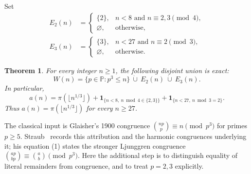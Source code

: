 \documentclass[11pt]{article}
\newtheorem{theorem}{Theorem}
\newcommand{\pr}{\mathbb P}
\newcommand{\ind}{\mathbf 1}
\begin{document}
Set
\begin{align*}
 E_2(n)&=\begin{cases}\{2\},&n<8\text{ and }n\equiv2,3\pmod4,\\
                         \varnothing,&\text{otherwise},\end{cases}\\
 E_3(n)&=\begin{cases}\{3\},&n<27\text{ and }n\equiv2\pmod3,\\
                         \varnothing,&\text{otherwise}.\end{cases}
\end{align*}
\begin{theorem}\label{thm:exact}
For every integer $n\ge1$, the following disjoint union is exact:
\begin{equation}\label{eq:set}
 W(n)=\{p\in\pr:p^3\le n\}\ \dot\cup\ E_2(n)\ \dot\cup\ E_3(n).
\end{equation}
In particular,
\begin{equation}\label{eq:count}
 a(n)=\pi(\lfloor n^{1/3}\rfloor)
 +\ind_{\{n<8,\ n\bmod4\in\{2,3\}\}}
 +\ind_{\{n<27,\ n\bmod3=2\}}.
\end{equation}
Thus $a(n)=\pi(\lfloor n^{1/3}\rfloor)$ for every $n\ge27$.
\end{theorem}

The classical input is Glaisher's 1900 congruence
$\binom{np}{p}\equiv n\pmod{p^3}$ for primes $p\ge5$.
Straub~\cite[\S2, p.~899]{straub} records this attribution and the harmonic
congruences underlying it; his equation (1) states the stronger
Ljunggren congruence $\binom{ap}{bp}\equiv\binom ab\pmod{p^3}$.
Here the additional step is to distinguish equality of literal remainders
from congruence, and to treat $p=2,3$ explicitly.
\end{document}
